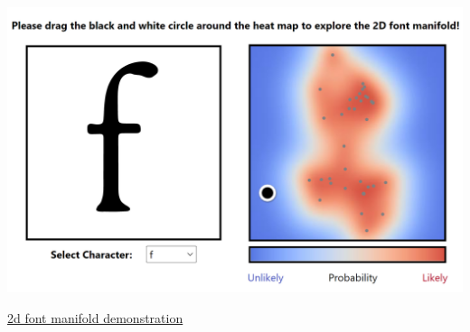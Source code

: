 \documentclass[fullscreen=true, bookmarks=true, hyperref={pdfencoding=unicode}]{beamer}
\begin{document}
\begin{frame}
  \begin{center}
    \includegraphics[keepaspectratio,
                     width=0.8\paperwidth]{2d-font-manifold.png}

  \href{https://www.ndfcampbell.org/research/fonts/}{2d font manifold demonstration}
  \end{center}
\end{frame}

\end{document}
